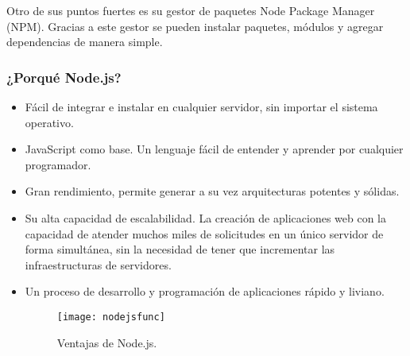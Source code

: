 

Otro de sus puntos fuertes es su gestor de paquetes Node Package Manager  (NPM). Gracias a este gestor se pueden instalar paquetes, módulos y agregar dependencias de manera simple.

\subsubsection{¿Porqué Node.js?}
\begin{itemize}
    \item Fácil de integrar e instalar en cualquier servidor, sin importar el sistema operativo.
    \item JavaScript como base. Un lenguaje fácil de entender y aprender por cualquier programador.
    \item Gran rendimiento, permite generar a su vez arquitecturas potentes y sólidas.
    \item Su alta capacidad de escalabilidad. La creación de aplicaciones web con la capacidad de atender muchos miles de solicitudes en un único servidor de forma simultánea, sin la necesidad de tener que incrementar las infraestructuras de servidores.
    \item Un proceso de desarrollo y programación de aplicaciones rápido y liviano.
        
    \begin{figure}[h]
        \centering
        \texttt{[image: nodejsfunc]}
        \caption{Ventajas de Node.js.}
        \label{fig:nodejsVentajas}
    \end{figure}
\end{itemize}


